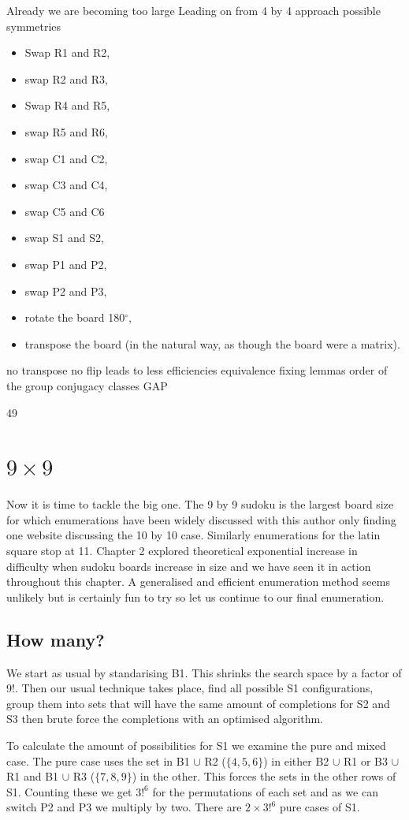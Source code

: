 \documentclass[a4paper,11pt]{report}
\newcounter{row}
\begin{document}
Already we are becoming too large
Leading on from 4 by 4 approach
possible symmetries
\begin{itemize}
\item Swap R1 and R2,
\item swap R2 and R3,
\item Swap R4 and R5,
\item swap R5 and R6,
\item swap C1 and C2,
\item swap C3 and C4,
\item swap C5 and C6
\item swap S1 and S2,
\item swap P1 and P2,
\item swap P2 and P3,
\item rotate the board 180$^\circ$,
\item transpose the board (in the natural way, as though the board were a matrix).
\end{itemize}
no transpose
no flip
leads to less efficiencies
equivalence 
fixing lemmas
order of the group
conjugacy classes
GAP 

49
	\section{$9 \times  9$}

Now it is time to tackle the big one. The 9 by 9 sudoku is the largest board size for which enumerations have been widely discussed with this author only finding one website discussing the 10 by 10 case. Similarly enumerations for the latin square stop at 11. Chapter 2 explored theoretical exponential increase in difficulty when sudoku boards increase in size and we have seen it in action throughout this chapter. A generalised and efficient enumeration method seems unlikely but is certainly fun to try so let us continue to our final enumeration.

\subsection{How many?}
We start as usual by standarising B1. This shrinks the search space by a factor of 9!. Then our usual technique takes place, find all possible S1 configurations, group them into sets that will have the same amount of completions for S2 and S3 then brute force the completions with an optimised algorithm.

To calculate the amount of possibilities for S1 we examine the pure and mixed case. The pure case uses the set  in B1 $\cup$ R2 ($\{4,5,6\}$) in either B2 $\cup$ R1 or B3 $\cup$ R1 and B1 $\cup$ R3 ($\{7,8,9\}$) in the other. This forces the sets in the other rows of S1. Counting these we get $3!^6$ for the permutations of each set and as we can switch P2 and P3 we multiply by two. There are $2\times 3!^6$ pure cases of S1. 
\end{document}
